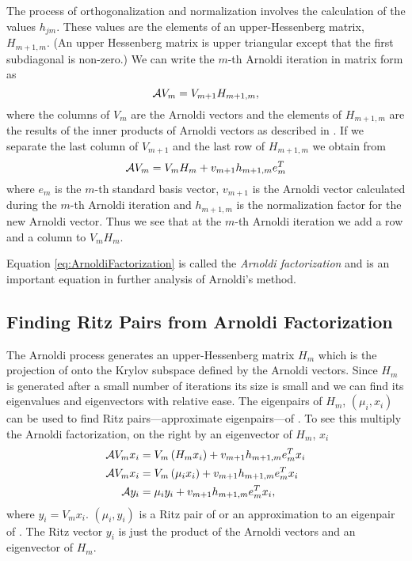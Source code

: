 The process of orthogonalization and normalization involves the calculation of the values $h_{jm}$.  These values are the elements of an upper-Hessenberg matrix, $H_{m+1,m}$.  (An upper Hessenberg matrix is upper triangular except that the first subdiagonal is non-zero.)  We can write the $m$-th Arnoldi iteration in matrix form as
\begin{equation}
    \mathcal{A} V_m = V_{m+1}H_{m+1,m}, 
    \label{eq:ArnoldiMatrixFormulation}
\end{equation}
where the columns of $V_m$ are the Arnoldi vectors and the elements of $H_{m+1,m}$ are the results of the inner products of Arnoldi vectors as described in .  If we separate the last column of $V_{m+1}$ and the last row of $H_{m+1,m}$ we obtain from 
\begin{equation}
    \mathcal{A} V_m = V_mH_m + v_{m+1}h_{m+1,m}e_m^T
    \label{eq:ArnoldiFactorization}
\end{equation}
where $e_m$ is the $m$-th standard basis vector, $v_{m+1}$ is the Arnoldi vector calculated during the $m$-th Arnoldi iteration and $h_{m+1,m}$ is the normalization factor for the new Arnoldi vector.  Thus we see that at the $m$-th Arnoldi iteration we add a row and a column to $V_mH_m$.  

Equation \eqref{eq:ArnoldiFactorization} is called the \emph{Arnoldi factorization} and is an important equation in further analysis of Arnoldi's method.  

\subsection{Finding Ritz Pairs from Arnoldi Factorization \label{sec:RitzPairs}}
The Arnoldi process generates an upper-Hessenberg matrix $H_m$ which is the projection of \A{} onto the Krylov subspace defined by the Arnoldi vectors.  Since $H_m$ is generated after a small number of iterations its size is small and we can find its eigenvalues and eigenvectors with relative ease.  The eigenpairs of $H_m$, \mbox{$\left(\mu_i, x_i\right)$} can be used to find Ritz pairs---approximate eigenpairs---of \A.  To see this multiply the Arnoldi factorization,  on the right by an eigenvector of $H_m$, $x_i$
\begin{equation}
    \begin{split}
        \mathcal{A} V_mx_i &= V_m\left( H_mx_i \right) + v_{m+1}h_{m+1,m}e_m^Tx_i \\
        \mathcal{A} V_mx_i &= V_m\left( \mu_ix_i \right) + v_{m+1}h_{m+1,m}e_m^Tx_i \\
        \mathcal{A} y_i &= \mu_iy_i + v_{m+1}h_{m+1,m}e_m^Tx_i,
    \end{split}
    \label{eq:ArnoldiFactorizationRitzPair}
\end{equation}
where $y_i = V_mx_i$. \mbox{$\left(\mu_i, y_i\right)$} is a Ritz pair of \A{} or an approximation to an eigenpair of \A.  The Ritz vector $y_i$ is just the product of the Arnoldi vectors and an eigenvector of $H_m$.

